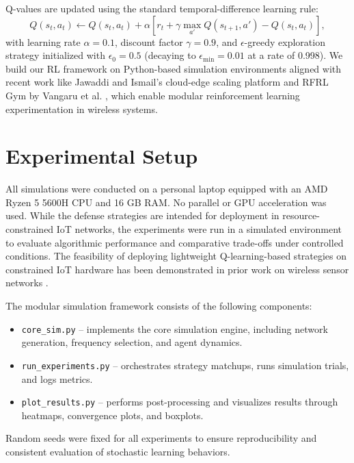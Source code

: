 \documentclass[conference]{IEEEtran}
\begin{document}
Q-values are updated using the standard temporal-difference learning rule:
\[
Q(s_t, a_t) \leftarrow Q(s_t, a_t) + \alpha \left[ r_t + \gamma \max_{a'} Q(s_{t+1}, a') - Q(s_t, a_t) \right],
\]
with learning rate $\alpha = 0.1$, discount factor $\gamma = 0.9$, and $\epsilon$-greedy exploration strategy initialized with $\epsilon_0 = 0.5$ (decaying to $\epsilon_{\min} = 0.01$ at a rate of 0.998). We build our RL framework on Python-based simulation environments aligned with recent work like Jawaddi and Ismail's cloud-edge scaling platform \cite{jawaddi2024python} and RFRL Gym by Vangaru et al. \cite{vangaru2024rfrl}, which enable modular reinforcement learning experimentation in wireless systems.

\section{Experimental Setup}

All simulations were conducted on a personal laptop equipped with an AMD Ryzen 5 5600H CPU and 16 GB RAM. No parallel or GPU acceleration was used. While the defense strategies are intended for deployment in resource-constrained IoT networks, the experiments were run in a simulated environment to evaluate algorithmic performance and comparative trade-offs under controlled conditions. The feasibility of deploying lightweight Q-learning-based strategies on constrained IoT hardware has been demonstrated in prior work on wireless sensor networks \cite{savaglio2019lightweight}.

The modular simulation framework consists of the following components:
\begin{itemize}
    \item \texttt{core\_sim.py} – implements the core simulation engine, including network generation, frequency selection, and agent dynamics.
    \item \texttt{run\_experiments.py} – orchestrates strategy matchups, runs simulation trials, and logs metrics.
    \item \texttt{plot\_results.py} – performs post-processing and visualizes results through heatmaps, convergence plots, and boxplots.
\end{itemize}

Random seeds were fixed for all experiments to ensure reproducibility and consistent evaluation of stochastic learning behaviors.

\end{document}
